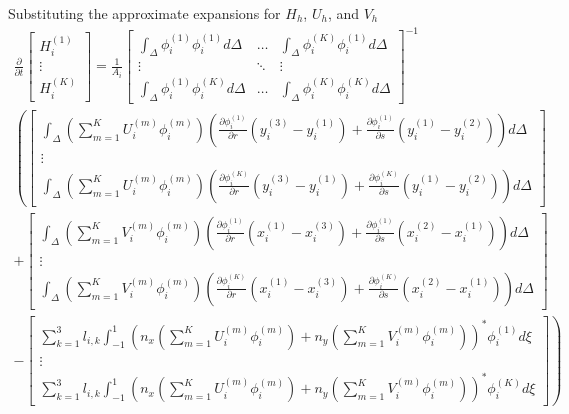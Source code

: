 \documentclass[11pt]{article}
\begin{document}
Substituting the approximate expansions for $H_h$, $U_h$, and $V_h$ 
{\tiny
\begin{multline}
\frac{\partial}{\partial t} \begin{bmatrix} H_i^{(1)} \\[5pt] \vdots \\[5pt] H_i^{(K)}  \end{bmatrix} =\frac{1}{A_i}\begin{bmatrix}\displaystyle\int_{\Delta}\phi_i^{(1)}\phi_i^{(1)}d\Delta & \hdots & \displaystyle\int_{\Delta}\phi_i^{(K)}\phi_i^{(1)}d\Delta \\[5pt] \vdots & \ddots & \vdots \\[5pt]  \displaystyle\int_{\Delta}\phi_i^{(1)}\phi_i^{(K)}d\Delta & \hdots & \displaystyle\int_{\Delta}\phi_i^{(K)}\phi_i^{(K)}d\Delta\end{bmatrix}^{-1}  \\ \left( \begin{bmatrix}\displaystyle\int_{\Delta}\left(\displaystyle\sum_{m=1}^{K}U_i^{(m)}\phi_i^{(m)}\right)\left(\frac{\partial \phi_i^{(1)}}{\partial r}\left(y_i^{(3)}-y_i^{(1)}\right) + \frac{\partial \phi_i^{(1)}}{\partial s}\left(y_i^{(1)}-y_i^{(2)}\right) \right)d\Delta     \\ \vdots \\ \displaystyle\int_{\Delta}\left(\displaystyle\sum_{m=1}^{K}U_i^{(m)}\phi_i^{(m)}\right)\left(\frac{\partial \phi_i^{(K)}}{\partial r}\left(y_i^{(3)}-y_i^{(1)}\right) + \frac{\partial \phi_i^{(K)}}{\partial s}\left(y_i^{(1)}-y_i^{(2)}\right) \right) d\Delta \end{bmatrix} \right.\\+ \left. \begin{bmatrix}  \displaystyle\int_{\Delta}\left(\displaystyle\sum_{m=1}^{K}V_i^{(m)}\phi_i^{(m)}\right)\left(\frac{\partial \phi_i^{(1)}}{\partial r}\left(x_i^{(1)}-x_i^{(3)}\right) + \frac{\partial \phi_i^{(1)}}{\partial s}\left(x_i^{(2)}-x_i^{(1)}\right) \right)d\Delta \\ \vdots \\ \displaystyle\int_{\Delta}\left(\displaystyle\sum_{m=1}^{K}V_i^{(m)}\phi_i^{(m)}\right)\left(\frac{\partial \phi_i^{(K)}}{\partial r}\left(x_i^{(1)}-x_i^{(3)}\right) + \frac{\partial \phi_i^{(K)}}{\partial s}\left(x_i^{(2)}-x_i^{(1)}\right) \right) d\Delta \end{bmatrix}  \right. \\ \left. -\begin{bmatrix}\displaystyle\sum_{k=1}^3 l_{i,k}\int_{-1}^1 \left(n_x\left(\displaystyle\sum_{m=1}^{K}U_i^{(m)}\phi_i^{(m)}\right)  + n_y\left(\displaystyle\sum_{m=1}^{K}V_i^{(m)}\phi_i^{(m)}\right)\right)^*\phi_i^{(1)} d\xi \\ \vdots \\ \displaystyle\sum_{k=1}^3 l_{i,k}\int_{-1}^1 \left(n_x\left(\displaystyle\sum_{m=1}^{K}U_i^{(m)}\phi_i^{(m)}\right) + n_y\left(\displaystyle\sum_{m=1}^{K}V_i^{(m)}\phi_i^{(m)}\right)\right)^*\phi_i^{(K)} d\xi \end{bmatrix} \right) 
\end{multline}}
\end{document}
